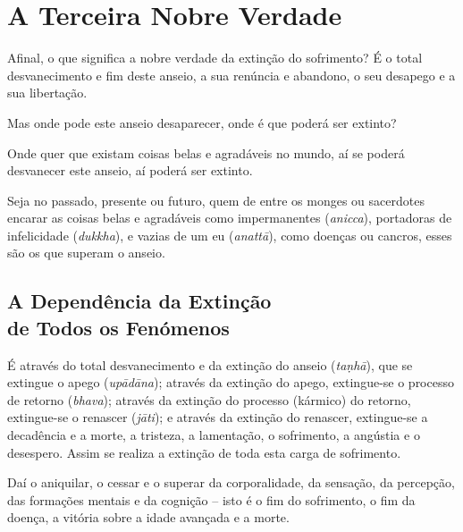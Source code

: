 
\chapter{A Terceira Nobre Verdade}


Afinal, o que significa a nobre verdade da extinção do sofrimento? É o total
desvanecimento e fim deste anseio, a sua renúncia e abandono, o seu desapego e a
sua libertação.

Mas onde pode este anseio desaparecer, onde é que poderá ser extinto?

Onde quer que existam coisas belas e agradáveis no mundo, aí se poderá desvanecer este anseio, aí poderá ser extinto.


Seja no passado, presente ou futuro, quem de entre os monges ou sacerdotes
encarar as coisas belas e agradáveis como impermanentes (\emph{anicca}),
portadoras de infelicidade (\emph{dukkha}), e vazias de um eu (\emph{anattā}),
como doenças ou cancros, esses são os que superam o anseio.


\section{A Dependência da Extinção\\ de Todos os Fenómenos}

É através do total desvanecimento e da extinção do anseio (\emph{taṇhā}), que se
extingue o apego (\emph{upādāna}); através da extinção do apego, extingue-se o
processo de retorno (\emph{bhava}); através da extinção do processo (kármico) do
retorno, extingue-se o renascer (\emph{jāti}); e através da extinção do
renascer, extingue-se a decadência e a morte, a tristeza, a lamentação, o
sofrimento, a angústia e o desespero. Assim se realiza a extinção de toda esta
carga de sofrimento.


Daí o aniquilar, o cessar e o superar da corporalidade, da sensação, da
percepção, das formações mentais e da cognição -- isto é o fim do sofrimento, o
fim da doença, a vitória sobre a idade avançada e a morte.


